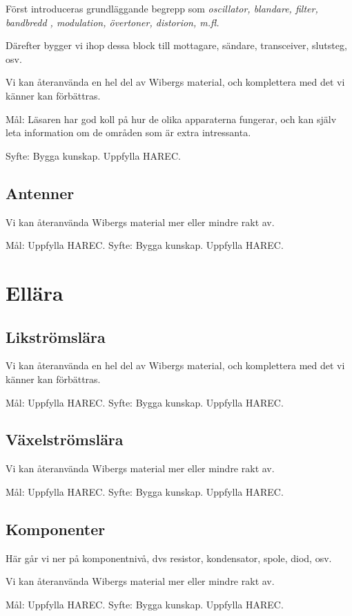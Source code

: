 \documentclass[a4paper,twoside,openright]{book}
\begin{document}
Först introduceras grundläggande begrepp som \emph{oscillator, blandare,
filter, bandbredd , modulation, övertoner, distorion, m.fl.}

Därefter bygger vi ihop dessa block till mottagare, sändare,
transceiver, slutsteg, osv.

Vi kan återanvända en hel del av Wibergs material, och komplettera med
det vi känner kan förbättras.

Mål: Läsaren har god koll på hur de olika apparaterna fungerar, och
kan själv leta information om de områden som är extra intressanta.

Syfte: Bygga kunskap. Uppfylla HAREC.

\chapter{Antenner}
Vi kan återanvända Wibergs material mer eller mindre rakt av.

Mål: Uppfylla HAREC.
Syfte: Bygga kunskap. Uppfylla HAREC.

\part{Ellära}

\chapter{Likströmslära}
Vi kan återanvända en hel del av Wibergs material, och komplettera med
det vi känner kan förbättras.

Mål: Uppfylla HAREC.
Syfte: Bygga kunskap. Uppfylla HAREC.

\chapter{Växelströmslära}
Vi kan återanvända Wibergs material mer eller mindre rakt av.

Mål: Uppfylla HAREC.
Syfte: Bygga kunskap. Uppfylla HAREC.

\chapter{Komponenter}
Här går vi ner på komponentnivå, dvs resistor, kondensator, spole,
diod, osv.

Vi kan återanvända Wibergs material mer eller mindre rakt av.

Mål: Uppfylla HAREC.
Syfte: Bygga kunskap. Uppfylla HAREC.
\end{document}
